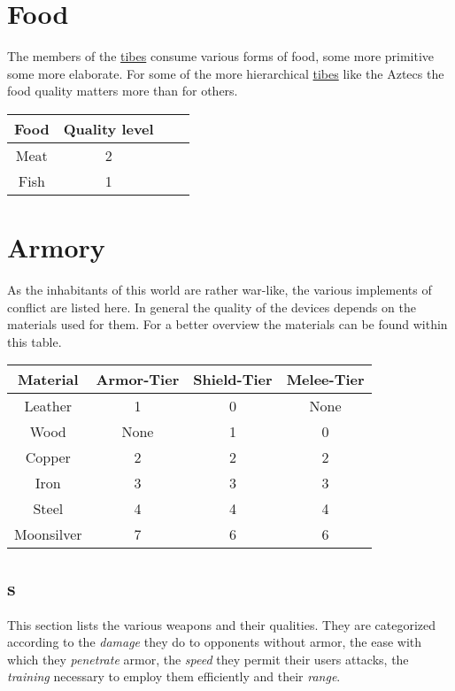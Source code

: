 \section{Food}\label{ch:Goods:Food}
The members of the \hyperref[ch:Tribes]{tibes} consume various forms of food,
some more primitive some more elaborate.
For some of the more hierarchical \hyperref[ch:Tribes]{tibes} like the \gls{Aztecs}
the food quality matters more than for others.


\begin{longtable}{cccc}
	\toprule
	Food & Quality level \\
	\midrule
	\Gls{Meat} & 2 \\
	\Gls{Fish} & 1 \\
	\bottomrule
\end{longtable}

\section{Armory}\label{ch:Goods:Armory}
As the inhabitants of this world are rather war-like, the various implements of
conflict are listed here. In general the quality of the devices depends on the
materials used for them. For a better overview the materials can be found
within this table.

\begin{longtable}{cccc}
	\toprule
	Material   & Armor-Tier & Shield-Tier & Melee-Tier \\
	\midrule
	Leather    & 1          & 0           & None       \\
	Wood       & None       & 1           & 0          \\
	Copper     & 2          & 2           & 2          \\
	Iron       & 3          & 3           & 3          \\
	Steel      & 4          & 4           & 4          \\
	Moonsilver & 7          & 6           & 6          \\ 
	\bottomrule
\end{longtable}

\subsection{s}\label{ch:Goods:Armory:Weapons}
This section lists the various weapons and
their qualities. They are categorized according to the \emph{damage} they do to
opponents without armor, the ease with which they \emph{penetrate} armor, the
\emph{speed} they permit their users attacks, the \emph{training} necessary to
employ them efficiently and their \emph{range}.

